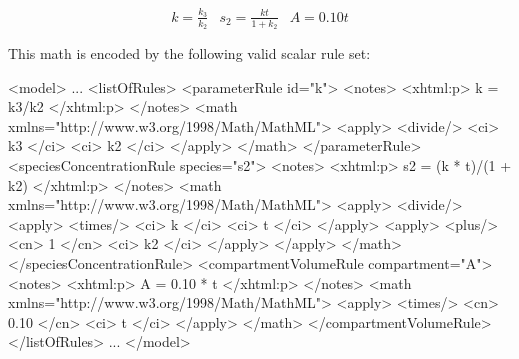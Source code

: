 \documentclass[10pt,twocolumntoc]{cekarticle}
\begin{document}
\begin{equation*}
  \begin{array}{lll}
    k = \frac{k_3}{k_2} & s_2 = \frac{k t}{1 + k_2} & A = 0.10 t\\ \\[-4pt]
  \end{array}
\end{equation*}
This math is encoded by the following valid scalar rule set:
\begin{example}
<model>
    ...
    <listOfRules>
        <parameterRule id="k">
            <notes>
                <xhtml:p>
                    k = k3/k2
                </xhtml:p>
            </notes>
            <math xmlns="http://www.w3.org/1998/Math/MathML">
                <apply>
                    <divide/>
                    <ci> k3 </ci>
                    <ci> k2 </ci>
                </apply>
            </math>
        </parameterRule>
        <speciesConcentrationRule species="s2">
            <notes>
                <xhtml:p>
                    s2 = (k * t)/(1 + k2)
                </xhtml:p>
            </notes>
            <math xmlns="http://www.w3.org/1998/Math/MathML">
                <apply>
                    <divide/>
                    <apply>
                        <times/>
                        <ci> k </ci>
                        <ci> t </ci>
                    </apply>
                    <apply>
                        <plus/>
                        <cn> 1 </cn>
                        <ci> k2 </ci>
                    </apply>
                </apply>
            </math>
        </speciesConcentrationRule>
        <compartmentVolumeRule compartment="A">
            <notes>
                <xhtml:p>
                    A = 0.10 * t
                </xhtml:p>
            </notes>
            <math xmlns="http://www.w3.org/1998/Math/MathML">
                <apply>
                    <times/>
                    <cn> 0.10 </cn>
                    <ci> t </ci>
                </apply>
            </math>
        </compartmentVolumeRule>
    </listOfRules>
    ...
</model>
\end{example}
\end{document}
